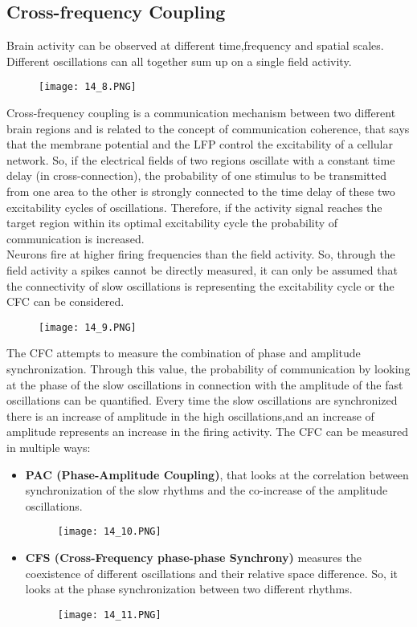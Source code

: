 \subsection{Cross-frequency Coupling}
Brain activity can be observed at different time,frequency and spatial scales. Different oscillations can all together sum up on a single field activity.
\begin{figure}[H]
    \centering
    \texttt{[image: 14\_8.PNG]}
\end{figure}
Cross-frequency coupling is a communication mechanism between two different brain regions and is related to the concept of communication coherence, that says that the membrane potential and the LFP control the excitability of a cellular network. So, if the electrical fields of two regions oscillate with a constant time delay (in cross-connection), the probability of one stimulus to be transmitted from one area to the other is strongly connected to the time delay of these two excitability cycles of oscillations. Therefore, if the activity signal reaches the target region within its optimal excitability cycle the probability of communication is increased.\\
Neurons fire at higher firing frequencies than the field activity. So, through the field activity a spikes cannot be directly measured, it can only be assumed that the connectivity of slow oscillations is representing the excitability cycle or the CFC can be considered. 
\begin{figure}[H]
    \centering
    \texttt{[image: 14\_9.PNG]}
\end{figure}
The CFC attempts to measure the combination of phase and amplitude synchronization. Through this value, the probability of communication by looking at the phase of the slow oscillations in connection with the amplitude of the fast oscillations can be quantified. Every time the slow oscillations are synchronized there is an increase of amplitude in the high oscillations,and an increase of amplitude represents an increase in the firing activity.
The CFC can be measured in multiple ways:
\begin{itemize}
    \item \textbf{PAC (Phase-Amplitude Coupling)}, that looks at the correlation between synchronization of the slow rhythms and the co-increase of the amplitude oscillations.
    \begin{figure}[H]
    \centering
    \texttt{[image: 14\_10.PNG]}
    \end{figure}
    \item \textbf{CFS (Cross-Frequency phase-phase Synchrony)} measures the coexistence of different oscillations and their relative space difference. So, it looks at the phase synchronization between two different rhythms.
    \begin{figure}[H]
    \centering
    \texttt{[image: 14\_11.PNG]}
    \end{figure}
\end{itemize}

